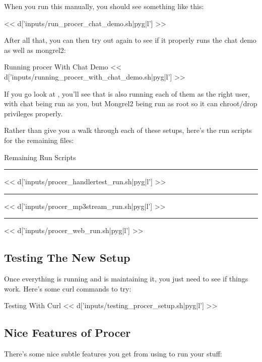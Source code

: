When you run this manually, you should see something like this:

<< d['inputs/run_procer_chat_demo.sh|pyg|l'] >>

After all that, you can then try out  again to see if it
properly runs the chat demo as well as mongrel2:

\begin{code}{Running procer With Chat Demo}
<< d['inputs/running_procer_with_chat_demo.sh|pyg|l'] >>
\end{code}

If you go look at , you'll see that 
is also running each of them as the right user, with chat being run
as you, but Mongrel2 being run as root so it can chroot/drop privileges properly.

Rather than give you a walk through each of these setups, here's the
run scripts for the remaining files:

\begin{code}{Remaining Run Scripts}
\hrule

<< d['inputs/procer_handlertest_run.sh|pyg|l'] >>

\hrule

<< d['inputs/procer_mp3stream_run.sh|pyg|l'] >>

\hrule

<< d['inputs/procer_web_run.sh|pyg|l'] >>
\end{code}


\subsection{Testing The New Setup}

Once everything is running and  is maintaining it, you
just need to see if things work.  Here's some curl commands to try:

\begin{code}{Testing With Curl}
<< d['inputs/testing_procer_setup.sh|pyg|l'] >>
\end{code}


\subsection{Nice Features of Procer}

There's some nice subtle features you get from using 
to run your stuff:

